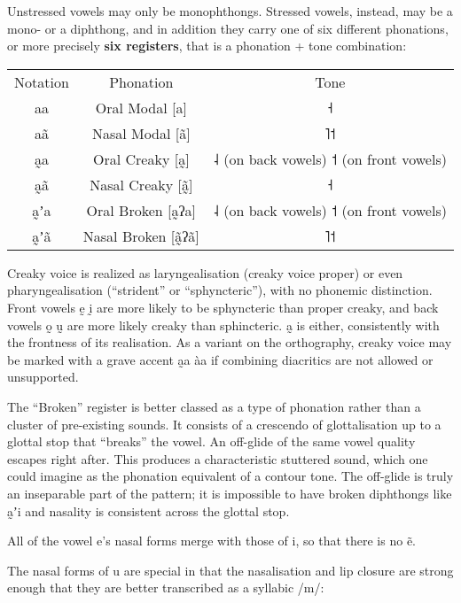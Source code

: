 \documentclass[11pt,a5paper]{book}
\newcommand{\qcn}[1]{\textcolor{AccentText}{\large#1}}
\begin{document}
Unstressed vowels may only be monophthongs. Stressed vowels, instead, may be a mono- or a diphthong, and in addition they carry one of six different phonations, or more precisely \textbf{six registers}, that is a phonation + tone combination:

\begin{center}
\begin{tabular}{c c c}
	Notation & Phonation & Tone\\
	\qcn{aa} & Oral Modal [a] & ˧\\
	\qcn{aã} & Nasal Modal [ã] & ˥˦\\
	\qcn{a̰a} & Oral Creaky [a̰] & ˨ (on back vowels) ˦ (on front vowels)\\
	\qcn{a̰ã} & Nasal Creaky [ã̰]& ˧\\
	\qcn{a̰ʼa} & Oral Broken [a̰ʔa] & ˨ (on back vowels) ˦ (on front vowels)\\
	\qcn{a̰ʼã} & Nasal Broken [ã̰ʔã] & ˥˦ \\
\end{tabular}
\end{center}

Creaky voice is realized as laryngealisation (creaky voice proper) or even pharyngealisation (``strident'' or ``sphyncteric''), with no phonemic distinction. Front vowels \qcn{ḛ ḭ} are more likely to be sphyncteric than proper creaky, and back vowels \qcn{o̰ ṵ} are more likely creaky than sphincteric. \qcn{a̰} is either, consistently with the frontness of its realisation. As a variant on the orthography, creaky voice may be marked with a grave accent \qcn{a̰a} \textrightarrow{}\qcn{àa} if combining diacritics are not allowed or unsupported.

The ``Broken'' register is better classed as a type of phonation rather than a cluster of pre-existing sounds. It consists of a crescendo of glottalisation up to a glottal stop that ``breaks'' the vowel. An off-glide of the same vowel quality escapes right after. This produces a characteristic stuttered sound, which one could imagine as the phonation equivalent of a contour tone. The off-glide is truly an inseparable part of the pattern; it is impossible to have broken diphthongs like \qcn{*a̰ʼi} and nasality is consistent across the glottal stop.

All of the vowel \qcn{e}'s nasal forms merge with those of \qcn{i}, so that there is no \qcn{*ẽ}.

The nasal forms of \qcn{u} are special in that the nasalisation and lip closure are strong enough that they are better transcribed as a syllabic /m/:
\end{document}
